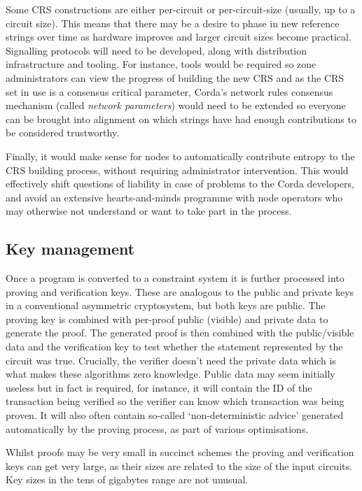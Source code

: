 \documentclass{article}
\begin{document}
Some CRS constructions are either per-circuit or per-circuit-size (usually, up to a circuit size). This means that
there may be a desire to phase in new reference strings over time as hardware improves and larger circuit sizes
become practical. Signalling protocols will need to be developed, along with distribution infrastructure and
tooling. For instance, tools would be required so zone administrators can view the progress of building the new CRS
and as the CRS set in use is a consensus critical parameter, Corda's network rules consensus mechanism (called
\emph{network parameters}) would need to be extended so everyone can be brought into alignment on which strings
have had enough contributions to be considered trustworthy.

Finally, it would make sense for nodes to automatically contribute entropy to the CRS building process, without
requiring administrator intervention. This would effectively shift questions of liability in case of problems to
the Corda developers, and avoid an extensive hearts-and-minds programme with node operators who may otherwise not
understand or want to take part in the process.

\subsection{Key management}\label{subsec:key-management}

Once a program is converted to a constraint system it is further processed into proving and verification
keys. These are analogous to the public and private keys in a conventional asymmetric cryptosystem, but both keys
are public. The proving key is combined with per-proof public (visible) and private data to generate the proof.
The generated proof is then combined with the public/visible data and the verification key to test whether the
statement represented by the circuit was true. Crucially, the verifier doesn't need the private data which is
what makes these algorithms zero knowledge. Public data may seem initially useless but in fact is required,
for instance, it will contain the ID of the transaction being verified so the verifier can know which
transaction was being proven. It will also often contain so-called `non-deterministic advice' generated
automatically by the proving process, as part of various optimisations.

Whilst proofs may be very small in succinct schemes the proving and verification keys can get very large, as their
sizes are related to the size of the input circuits. Key sizes in the tens of gigabytes range are not unusual.
\end{document}
